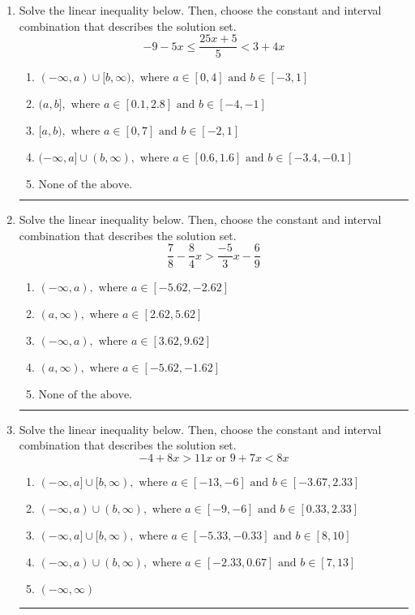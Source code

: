 \documentclass[14pt]{extbook}
\newcommand{\litem}[1]{\item#1\hspace*{-1cm}\rule{\textwidth}{0.4pt}}
\begin{document}
\begin{enumerate}
\litem{
Solve the linear inequality below. Then, choose the constant and interval combination that describes the solution set.\[ -9 - 5 x \leq \frac{25 x + 5}{5} < 3 + 4 x \]\begin{enumerate}[label=\Alph*.]
\item \( (-\infty, a) \cup [b, \infty), \text{ where } a \in [0, 4] \text{ and } b \in [-3, 1] \)
\item \( (a, b], \text{ where } a \in [0.1, 2.8] \text{ and } b \in [-4, -1] \)
\item \( [a, b), \text{ where } a \in [0, 7] \text{ and } b \in [-2, 1] \)
\item \( (-\infty, a] \cup (b, \infty), \text{ where } a \in [0.6, 1.6] \text{ and } b \in [-3.4, -0.1] \)
\item \( \text{None of the above.} \)

\end{enumerate} }
\litem{
Solve the linear inequality below. Then, choose the constant and interval combination that describes the solution set.\[ \frac{7}{8} - \frac{8}{4} x > \frac{-5}{3} x - \frac{6}{9} \]\begin{enumerate}[label=\Alph*.]
\item \( (-\infty, a), \text{ where } a \in [-5.62, -2.62] \)
\item \( (a, \infty), \text{ where } a \in [2.62, 5.62] \)
\item \( (-\infty, a), \text{ where } a \in [3.62, 9.62] \)
\item \( (a, \infty), \text{ where } a \in [-5.62, -1.62] \)
\item \( \text{None of the above}. \)

\end{enumerate} }
\litem{
Solve the linear inequality below. Then, choose the constant and interval combination that describes the solution set.\[ -4 + 8 x > 11 x \text{ or } 9 + 7 x < 8 x \]\begin{enumerate}[label=\Alph*.]
\item \( (-\infty, a] \cup [b, \infty), \text{ where } a \in [-13, -6] \text{ and } b \in [-3.67, 2.33] \)
\item \( (-\infty, a) \cup (b, \infty), \text{ where } a \in [-9, -6] \text{ and } b \in [0.33, 2.33] \)
\item \( (-\infty, a] \cup [b, \infty), \text{ where } a \in [-5.33, -0.33] \text{ and } b \in [8, 10] \)
\item \( (-\infty, a) \cup (b, \infty), \text{ where } a \in [-2.33, 0.67] \text{ and } b \in [7, 13] \)
\item \( (-\infty, \infty) \)


\end{enumerate}}
\end{enumerate}
\end{document}
